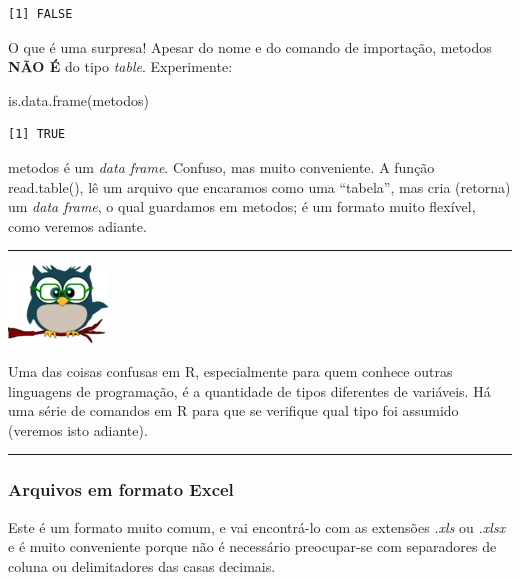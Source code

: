 \documentclass[
]{article}
\newenvironment{Shaded}{\begin{snugshade}}{\end{snugshade}}
\newcommand{\FunctionTok}[1]{\textcolor[rgb]{0.00,0.00,0.00}{#1}}
\newcommand{\NormalTok}[1]{#1}
\begin{document}
\begin{verbatim}
[1] FALSE
\end{verbatim}

O que é uma surpresa! Apesar do nome e do comando de importação, metodos
\textbf{NÃO É} do tipo \emph{table}. Experimente:

\begin{Shaded}
\begin{Highlighting}[]
\FunctionTok{is.data.frame}\NormalTok{(metodos)}
\end{Highlighting}
\end{Shaded}

\begin{verbatim}
[1] TRUE
\end{verbatim}

metodos é um \emph{data frame}. Confuso, mas muito conveniente. A função
read.table(), lê um arquivo que encaramos como uma ``tabela'', mas cria
(retorna) um \emph{data frame}, o qual guardamos em metodos; é um
formato muito flexível, como veremos adiante.

\begin{center}\rule{0.5\linewidth}{0.5pt}\end{center}

\begin{flushleft}\includegraphics[width=0.08\linewidth]{coruja} \end{flushleft}

Uma das coisas confusas em R, especialmente para quem conhece outras
linguagens de programação, é a quantidade de tipos diferentes de
variáveis. Há uma série de comandos em R para que se verifique qual tipo
foi assumido (veremos isto adiante).

\begin{center}\rule{0.5\linewidth}{0.5pt}\end{center}

\hypertarget{arquivos-em-formato-excel}{%
\subsubsection{Arquivos em formato
Excel}\label{arquivos-em-formato-excel}}

Este é um formato muito comum, e vai encontrá-lo com as extensões
\emph{.xls} ou \emph{.xlsx} e é muito conveniente porque não é
necessário preocupar-se com separadores de coluna ou delimitadores das
casas decimais.
\end{document}
